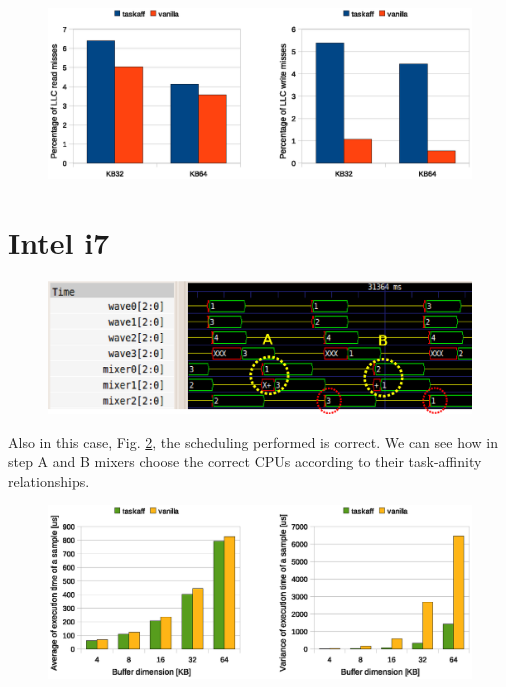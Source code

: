 \begin{figure}[htbp]
\centering
\includegraphics[width=\widefigure]{images/results_xeon/l2_load_store_xeon.eps}
\caption{}
\label{fig:l2_load_store_xeon}
\end{figure}

\section{Intel i7}

\begin{figure}[htbp]
\centering
\includegraphics[width=\widefigure]{images/results_i7/final_i7.eps}
\caption{}
\label{fig:trace_i7}
\end{figure}

Also in this case, Fig. \ref{fig:trace_i7}, the scheduling performed is correct. We can see how in step A and B mixers choose the correct CPUs according to
their task-affinity relationships.

\begin{figure}[htbp]
\centering
\includegraphics[width=\widefigure]{images/results_i7/time_avg_var_i7.eps}
\caption{}
\label{fig:time_avg_var_i7}
\end{figure}

